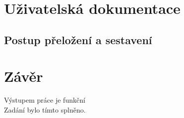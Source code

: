 \documentclass[
12pt,
a4paper,
pdftex,
czech,
titlepage
]{report}
\begin{document}
\chapter{Uživatelská dokumentace} 
\section{Postup přeložení a sestavení}

\chapter{Závěr}
Výstupem práce je funkční \\
Zadání bylo tímto splněno.
\end{document}
